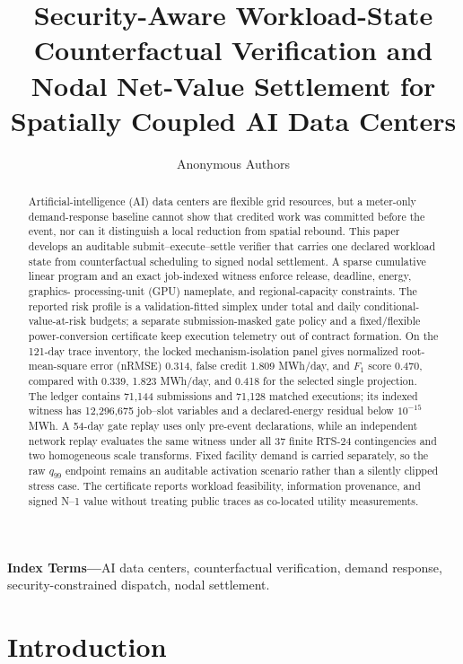 \documentclass[10pt,journal]{IEEEtran}
\title{Security-Aware Workload-State Counterfactual Verification and\\
Nodal Net-Value Settlement for Spatially Coupled AI Data Centers}
\author{Anonymous Authors}
\begin{document}
\maketitle

\begin{abstract}
Artificial-intelligence (AI) data centers are flexible grid resources, but a
meter-only demand-response baseline cannot show that credited work was
committed before the event, nor can it distinguish a local reduction from
spatial rebound. This paper develops an auditable submit--execute--settle
verifier that carries one declared workload state from counterfactual
scheduling to signed nodal settlement. A sparse cumulative linear program and
an exact job-indexed witness enforce release, deadline, energy, graphics-
processing-unit (GPU) nameplate, and regional-capacity constraints. The
reported risk profile is a validation-fitted simplex under total and daily
conditional-value-at-risk budgets; a separate submission-masked gate policy
and a fixed/flexible power-conversion certificate keep execution telemetry out
of contract formation. On the 121-day trace inventory, the locked
mechanism-isolation panel gives normalized root-mean-square error (nRMSE)
0.314, false credit 1.809 MWh/day, and $F_1$ score 0.470, compared with
0.339, 1.823 MWh/day, and 0.418 for the selected single projection. The ledger contains 71,144 submissions and 71,128 matched
executions; its indexed witness has 12,296,675 job--slot variables and a
declared-energy residual below $10^{-15}$ MWh. A 54-day gate replay uses only
pre-event declarations, while an independent network replay evaluates the
same witness under all 37 finite RTS-24 contingencies and two homogeneous
scale transforms. Fixed facility demand is carried separately, so the raw
$q_{99}$ endpoint remains an auditable activation scenario rather than a
silently clipped stress case. The certificate reports workload feasibility,
information provenance, and signed N--1 value without treating public traces
as co-located utility measurements.
\end{abstract}

\noindent\textbf{Index Terms---}AI data centers, counterfactual verification,
demand response, security-constrained dispatch, nodal settlement.

\section{Introduction}
\end{document}
